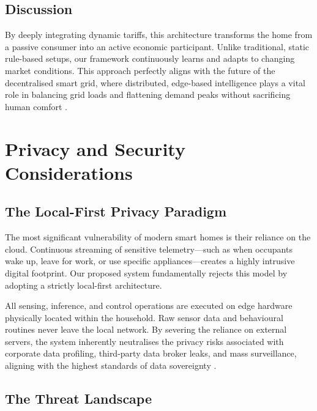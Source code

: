 \documentclass[11pt,a4paper]{article}
\begin{document}
\subsection{Discussion}

By deeply integrating dynamic tariffs, this architecture transforms the home from a passive consumer into an active economic participant. Unlike traditional, static rule-based setups, our framework continuously learns and adapts to changing market conditions. This approach perfectly aligns with the future of the decentralised smart grid, where distributed, edge-based intelligence plays a vital role in balancing grid loads and flattening demand peaks without sacrificing human comfort \cite{siano2014demand}.

\section{Privacy and Security Considerations}

\subsection{The Local-First Privacy Paradigm}

The most significant vulnerability of modern smart homes is their reliance on the cloud. Continuous streaming of sensitive telemetry---such as when occupants wake up, leave for work, or use specific appliances---creates a highly intrusive digital footprint. Our proposed system fundamentally rejects this model by adopting a strictly local-first architecture.

All sensing, inference, and control operations are executed on edge hardware physically located within the household. Raw sensor data and behavioural routines never leave the local network. By severing the reliance on external servers, the system inherently neutralises the privacy risks associated with corporate data profiling, third-party data broker leaks, and mass surveillance, aligning with the highest standards of data sovereignty \cite{lin2017survey}.

\subsection{The Threat Landscape}
\end{document}
